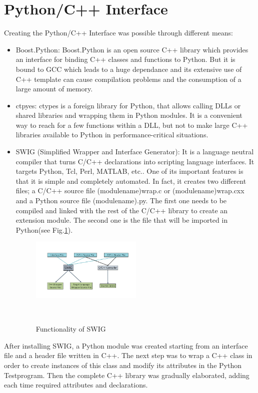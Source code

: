 \section{Python/C++ Interface}
Creating the Python/C++ Interface was possible through different means:\\
\begin{itemize}
\item Boost.Python: Boost.Python is an open source C++ library which provides an interface for binding C++ classes and functions to Python. But it is bound to GCC which leads to a huge dependance and its extensive use of C++ template can cause compilation problems and the consumption of a large amount of memory. \\
\item ctpyes: ctypes is a foreign library for Python, that allows calling DLLs or shared libraries and wrapping them in Python modules. It is a convenient way to reach for a few functions within a DLL, but not to make large C++ libraries available to Python in performance-critical situations.\\
\item SWIG (Simplified Wrapper and Interface Generator): It is a language neutral compiler that turns C/C++ declarations into scripting language interfaces. It targets Python, Tcl, Perl, MATLAB, etc.. One of its important features is that it is simple and completely automated. In fact, it creates two different files; a C/C++ source file (module\textunderscore name)\textunderscore wrap.c or (module\textunderscore name)\textunderscore wrap.cxx and a Python source file (module\textunderscore name).py. The first one needs to be compiled and linked with the rest of the C/C++ library to create an extension module. The second one is the file that will be imported in Python(see Fig.\ref{fig:swig}).\\
\begin{figure}[htb]
  \centering
  \includegraphics[width=0.5\textwidth]{figures/swig_func}
  \caption{Functionality of SWIG} ~\cite{swig}
  \label{fig:swig}
\end{figure}
\end{itemize}
After installing SWIG, a Python module was created starting from an interface file and a header file written in C++. The next step was to wrap a C++ class in order to create instances of this class and modify its attributes in the Python Testprogram. Then the complete C++ library was gradually elaborated, adding each time required attributes and declarations.\\
